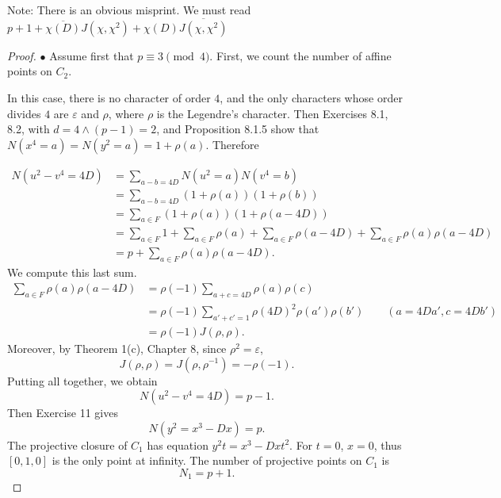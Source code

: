 \documentclass[11pt,a4paper]{article}
\begin{document}
Note: There is an obvious misprint. We must read $p+1 + \overline{\chi(D)} J(\chi,\chi^2) + \chi(D) \overline{J(\chi,\chi^2)}$
\begin{proof} 

$\bullet$ Assume first that $p\equiv 3 \pmod 4$. First, we count the number of affine points on $C_2$. 

In this case, there is no character of order $4$, and the only characters whose order divides $4$ are $\varepsilon$ and $\rho$, where $\rho$ is the Legendre's character. Then Exercises 8.1, 8.2,  with $d = 4 \wedge (p-1) = 2$, and Proposition 8.1.5 show that $N(x^4 = a) = N(y^2 =a) = 1 + \rho(a).$ Therefore


\begin{align*}
N(u^2 - v^4 = 4D) &= \sum_{a-b = 4D} N(u^2=a)N(v^4=b)\\
&=\sum_{a-b = 4D} (1+\rho(a))(1+\rho(b))\\
&=\sum_{a \in F} (1+ \rho(a))(1+ \rho(a-4D))\\
&= \sum_{a \in F} 1 + \sum_{a \in F} \rho(a) + \sum_{a \in F} \rho(a-4D) + \sum_{a\in F}\rho(a) \rho(a-4D)\\
&= p + \sum_{a\in F}\rho(a) \rho(a-4D).
\end{align*}
We compute this last sum.
\begin{align*}
\sum_{a\in F}\rho(a) \rho(a-4D) &= \rho(-1) \sum_{a + c = 4D} \rho(a) \rho(c)\\

&= \rho(-1) \sum_{a'+c' = 1} \rho(4D)^2 \rho(a') \rho(b')\qquad (a = 4Da', c = 4Db')\\
&= \rho(-1) J(\rho,\rho).
\end{align*}
Moreover, by Theorem 1(c), Chapter 8, since $\rho^2 = \varepsilon$,
$$J(\rho,\rho) = J(\rho, \rho^{-1}) = -\rho(-1).$$
Putting all together, we obtain
$$N(u^2 - v^4 = 4D) = p-1.$$
Then Exercise 11 gives
$$N(y^2 = x^3 -Dx) = p.$$
The projective closure of $C_1$ has equation $y^2 t =x^3 - Dxt^2$. For $t=0$, $x=0$, thus $[0,1,0]$ is the only point at infinity. The number of projective points on $C_1$ is
$$N_1 = p+1.$$

\bigskip


\end{proof}
\end{document}

